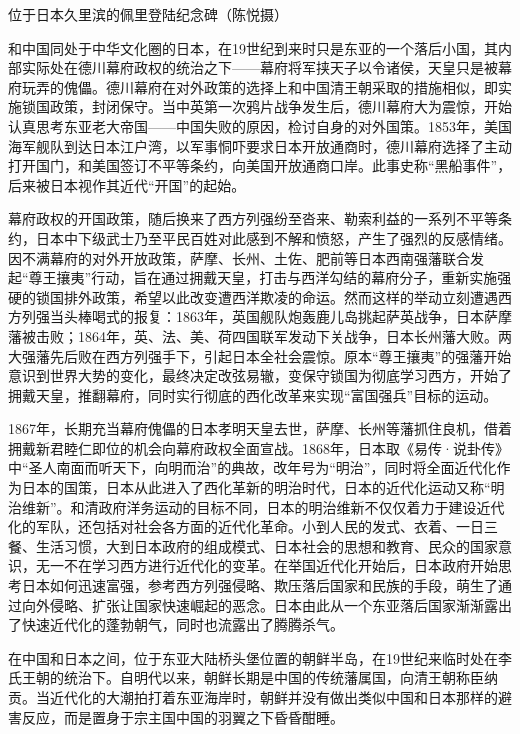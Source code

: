 \documentclass[12pt,UTF8]{ctexbook}
\begin{document}
位于日本久里滨的佩里登陆纪念碑（陈悦摄）

和中国同处于中华文化圈的日本，在19世纪到来时只是东亚的一个落后小国，其内部实际处在德川幕府政权的统治之下——幕府将军挟天子以令诸侯，天皇只是被幕府玩弄的傀儡。德川幕府在对外政策的选择上和中国清王朝采取的措施相似，即实施锁国政策，封闭保守。当中英第一次鸦片战争发生后，德川幕府大为震惊，开始认真思考东亚老大帝国——中国失败的原因，检讨自身的对外国策。1853年，美国海军舰队到达日本江户湾，以军事恫吓要求日本开放通商时，德川幕府选择了主动打开国门，和美国签订不平等条约，向美国开放通商口岸。此事史称“黑船事件”，后来被日本视作其近代“开国”的起始。

幕府政权的开国政策，随后换来了西方列强纷至沓来、勒索利益的一系列不平等条约，日本中下级武士乃至平民百姓对此感到不解和愤怒，产生了强烈的反感情绪。因不满幕府的对外开放政策，萨摩、长州、土佐、肥前等日本西南强藩联合发起“尊王攘夷”行动，旨在通过拥戴天皇，打击与西洋勾结的幕府分子，重新实施强硬的锁国排外政策，希望以此改变遭西洋欺凌的命运。然而这样的举动立刻遭遇西方列强当头棒喝式的报复：1863年，英国舰队炮轰鹿儿岛挑起萨英战争，日本萨摩藩被击败；1864年，英、法、美、荷四国联军发动下关战争，日本长州藩大败。两大强藩先后败在西方列强手下，引起日本全社会震惊。原本“尊王攘夷”的强藩开始意识到世界大势的变化，最终决定改弦易辙，变保守锁国为彻底学习西方，开始了拥戴天皇，推翻幕府，同时实行彻底的西化改革来实现“富国强兵”目标的运动。

1867年，长期充当幕府傀儡的日本孝明天皇去世，萨摩、长州等藩抓住良机，借着拥戴新君睦仁即位的机会向幕府政权全面宣战。1868年，日本取《易传·说卦传》中“圣人南面而听天下，向明而治”的典故，改年号为“明治”，同时将全面近代化作为日本的国策，日本从此进入了西化革新的明治时代，日本的近代化运动又称“明治维新”。和清政府洋务运动的目标不同，日本的明治维新不仅仅着力于建设近代化的军队，还包括对社会各方面的近代化革命。小到人民的发式、衣着、一日三餐、生活习惯，大到日本政府的组成模式、日本社会的思想和教育、民众的国家意识，无一不在学习西方进行近代化的变革。在举国近代化开始后，日本政府开始思考日本如何迅速富强，参考西方列强侵略、欺压落后国家和民族的手段，萌生了通过向外侵略、扩张让国家快速崛起的恶念。日本由此从一个东亚落后国家渐渐露出了快速近代化的蓬勃朝气，同时也流露出了腾腾杀气。

在中国和日本之间，位于东亚大陆桥头堡位置的朝鲜半岛，在19世纪来临时处在李氏王朝的统治下。自明代以来，朝鲜长期是中国的传统藩属国，向清王朝称臣纳贡。当近代化的大潮拍打着东亚海岸时，朝鲜并没有做出类似中国和日本那样的避害反应，而是置身于宗主国中国的羽翼之下昏昏酣睡。
\end{document}
